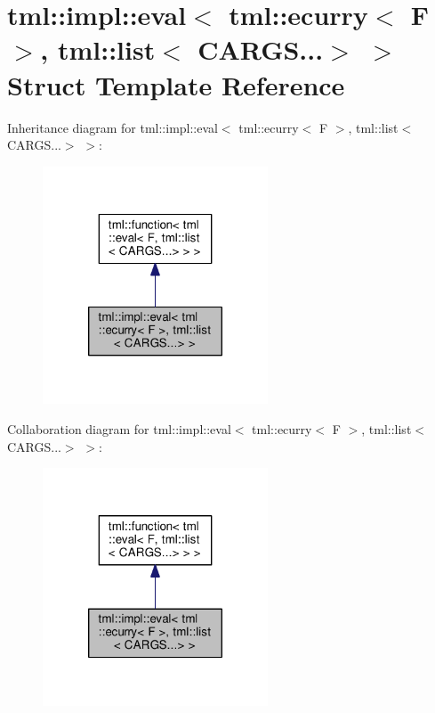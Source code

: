 \hypertarget{structtml_1_1impl_1_1eval_3_01tml_1_1ecurry_3_01_f_01_4_00_01tml_1_1list_3_01_c_a_r_g_s_8_8_8_4_01_4}{\section{tml\+:\+:impl\+:\+:eval$<$ tml\+:\+:ecurry$<$ F $>$, tml\+:\+:list$<$ C\+A\+R\+G\+S...$>$ $>$ Struct Template Reference}
\label{structtml_1_1impl_1_1eval_3_01tml_1_1ecurry_3_01_f_01_4_00_01tml_1_1list_3_01_c_a_r_g_s_8_8_8_4_01_4}
}


Inheritance diagram for tml\+:\+:impl\+:\+:eval$<$ tml\+:\+:ecurry$<$ F $>$, tml\+:\+:list$<$ C\+A\+R\+G\+S...$>$ $>$\+:
\nopagebreak
\begin{figure}[H]
\begin{center}
\leavevmode
\includegraphics[width=190pt]{structtml_1_1impl_1_1eval_3_01tml_1_1ecurry_3_01_f_01_4_00_01tml_1_1list_3_01_c_a_r_g_s_8_8_8_4_01_4__inherit__graph}
\end{center}
\end{figure}


Collaboration diagram for tml\+:\+:impl\+:\+:eval$<$ tml\+:\+:ecurry$<$ F $>$, tml\+:\+:list$<$ C\+A\+R\+G\+S...$>$ $>$\+:
\nopagebreak
\begin{figure}[H]
\begin{center}
\leavevmode
\includegraphics[width=190pt]{structtml_1_1impl_1_1eval_3_01tml_1_1ecurry_3_01_f_01_4_00_01tml_1_1list_3_01_c_a_r_g_s_8_8_8_4_01_4__coll__graph}
\end{center}
\end{figure}
